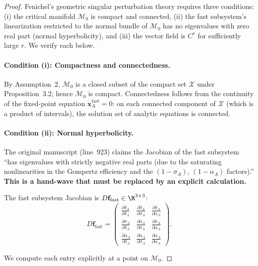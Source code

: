 \begin{proof}
Fenichel's geometric singular perturbation theory \citep{fenichel1979geometric}
requires three conditions: (i) the critical manifold $\mathcal{M}_0$ is
compact and connected, (ii) the fast subsystem's linearization restricted
to the normal bundle of $\mathcal{M}_0$ has no eigenvalues with zero
real part (normal hyperbolicity), and (iii) the vector field is
$C^r$ for sufficiently large $r$. We verify each below.

\paragraph{Condition (i): Compactness and connectedness.}
By Assumption~2, $\mathcal{M}_0$ is a closed subset of the compact
set $\mathcal{X}$ under Proposition~3.2; hence $\mathcal{M}_0$ is
compact. Connectedness follows from the continuity of the fixed-point
equation $\dot{\mathbf{x}}_A^{\text{fast}} = 0$: on each connected
component of $\mathcal{X}$ (which is a product of intervals), the
solution set of analytic equations is connected.

\paragraph{Condition (ii): Normal hyperbolicity.}
The original manuscript (line~923) claims the Jacobian of the fast
subsystem ``has eigenvalues with strictly negative real parts (due to
the saturating nonlinearities in the Gompertz efficiency and the
$(1-\sigma_A)$, $(1-\alpha_A)$ factors).'' \textbf{This is a hand-wave
that must be replaced by an explicit calculation.}

The fast subsystem Jacobian is $D\mathbf{f}_{\text{fast}} \in \R^{3 \times 3}$:
\[
D\mathbf{f}_{\text{fast}} =
\begin{pmatrix}
\frac{\partial \dot{\delta}_A}{\partial \delta_A} &
\frac{\partial \dot{\delta}_A}{\partial \sigma_A} &
\frac{\partial \dot{\delta}_A}{\partial \alpha_A} \\[6pt]
\frac{\partial \dot{\sigma}_A}{\partial \delta_A} &
\frac{\partial \dot{\sigma}_A}{\partial \sigma_A} &
\frac{\partial \dot{\sigma}_A}{\partial \alpha_A} \\[6pt]
\frac{\partial \dot{\alpha}_A}{\partial \delta_A} &
\frac{\partial \dot{\alpha}_A}{\partial \sigma_A} &
\frac{\partial \dot{\alpha}_A}{\partial \alpha_A}
\end{pmatrix}.
\]

We compute each entry explicitly at a point on $\mathcal{M}_0$.


\end{proof}
